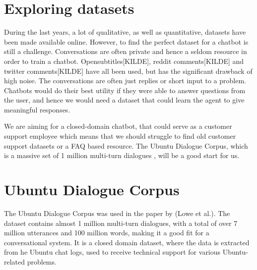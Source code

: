 \documentclass{article} %
\begin{document}




\section{Exploring datasets}
During the last years, a lot of qualitative, as well as quantitative, datasets have been made available online. However, to find the perfect dataset for a chatbot is still a challenge. Conversations are often private and hence a seldom resource in order to train a chatbot. Opensubtitles[KILDE], reddit comments[KILDE] and twitter comments[KILDE] have all been used, but has the significant drawback of high noise. The conversations are often just replies or short input to a problem. Chatbots would do their best utility if they were able to answer questions from the user, and hence we would need a dataset that could learn the agent to give meaningful responses.

We are aiming for a closed-domain chatbot, that could serve as a customer support employee which means that we should struggle to find old customer support datasets or a FAQ based resource. The Ubuntu Dialogue Corpus, which is a massive set of 1 million multi-turn dialogues \cite{Lowe}, will be a good start for us.  %

\section{Ubuntu Dialogue Corpus}
The Ubuntu Dialogue Corpus was used in the paper by (Lowe et al.). The dataset contains almost 1 million multi-turn dialogues, with a total of over 7 million utterances and 100 million words, making it a good fit for a conversational system. It is a closed domain dataset, where the data is extracted from he Ubuntu chat logs, used to receive technical support for various Ubuntu-related problems. \cite{Lowe}
\end{document}
